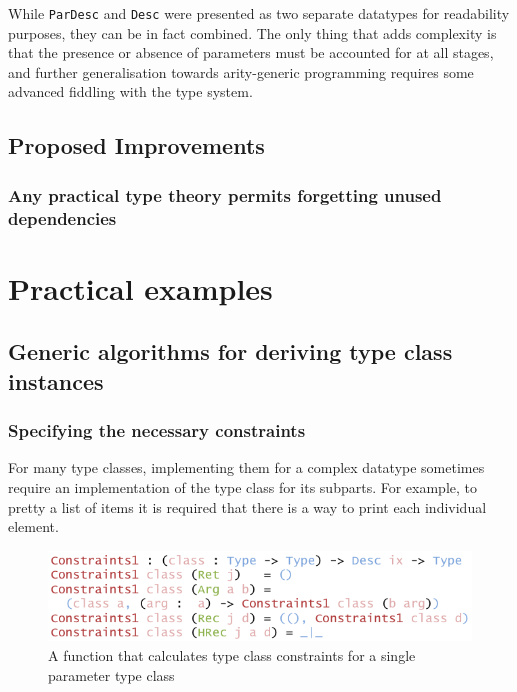 \documentclass{ituthesis}
\newcommand{\tttype}[1]{\textcolor{type-color}{\texttt{#1}}}
\theoremstyle{break}
\begin{document}
While \tttype{ParDesc} and \tttype{Desc} were presented as two separate datatypes for readability purposes, they can be in fact combined.
The only thing that adds complexity is that the presence or absence of parameters must be accounted for at all stages, and further generalisation towards arity-generic programming requires some advanced fiddling with the type system.


\section{Proposed Improvements}
\label{sec:ProposedImprovements}

\subsection{Any practical type theory permits forgetting unused dependencies}
\label{sub:Any practical type theory permits forgetting unused dependencies}


\chapter{Practical examples}
\label{cha:PracticalExamples}

\section{Generic algorithms for deriving type class instances}
\label{sec:Genericalgorithmsforderivingtypeclassinstances}

\subsection{Specifying the necessary constraints}
\label{sub:Specifying the necessary constraints}

For many type classes, implementing them for a complex datatype sometimes require an implementation of the type class for its subparts.
For example, to pretty a list of items it is required that there is a way to print each individual element.

\begin{figure}[ht]
\begin{center}
    \includegraphics[scale=0.5]{Figures/ConstrainingTypeclasses.png}
\end{center}
\caption{A function that calculates type class constraints for a single parameter type class}
\label{fig:constrclass}
\end{figure}
\end{document}
